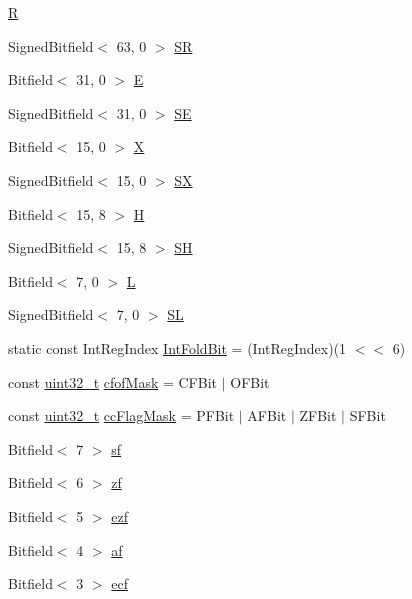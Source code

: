 \begin{DoxyCompactItemize}
\item 
\hyperlink{namespaceX86ISA_acb95449a94688af33f6e9bb090cf2936}{R}
\item 
SignedBitfield$<$ 63, 0 $>$ \hyperlink{namespaceX86ISA_a62886be1bcbf64566d5d2f90a0d27ffe}{SR}
\item 
Bitfield$<$ 31, 0 $>$ \hyperlink{namespaceX86ISA_a71b154dead8fe7930c20fe9b4ce8ae3b}{E}
\item 
SignedBitfield$<$ 31, 0 $>$ \hyperlink{namespaceX86ISA_abbbf2eaf763539e94e31a3f4a250c99a}{SE}
\item 
Bitfield$<$ 15, 0 $>$ \hyperlink{namespaceX86ISA_a8c8da34a185dfa074d1b9976b7ce7a93}{X}
\item 
SignedBitfield$<$ 15, 0 $>$ \hyperlink{namespaceX86ISA_a4e9bd10f5da85e48ae4377e8962cf60a}{SX}
\item 
Bitfield$<$ 15, 8 $>$ \hyperlink{namespaceX86ISA_a1cad4492b2894c49eeb063c9a9569580}{H}
\item 
SignedBitfield$<$ 15, 8 $>$ \hyperlink{namespaceX86ISA_a8f9656f93dee1143c4946caffa827444}{SH}
\item 
Bitfield$<$ 7, 0 $>$ \hyperlink{namespaceX86ISA_a0485da3ef528ce3058f6f335248c0764}{L}
\item 
SignedBitfield$<$ 7, 0 $>$ \hyperlink{namespaceX86ISA_aa51df4793b85b67a85272738df83bcfa}{SL}
\item 
static const IntRegIndex \hyperlink{namespaceX86ISA_a839d36f6b65e52c16579f4cdb5165f15}{IntFoldBit} = (IntRegIndex)(1 $<$$<$ 6)
\item 
const \hyperlink{Type_8hh_a435d1572bf3f880d55459d9805097f62}{uint32\_\-t} \hyperlink{namespaceX86ISA_a15a21dfb18ead541de5ffe79c5d26e2d}{cfofMask} = CFBit $|$ OFBit
\item 
const \hyperlink{Type_8hh_a435d1572bf3f880d55459d9805097f62}{uint32\_\-t} \hyperlink{namespaceX86ISA_ace12242afd3bc8679daac79ae1338404}{ccFlagMask} = PFBit $|$ AFBit $|$ ZFBit $|$ SFBit
\item 
Bitfield$<$ 7 $>$ \hyperlink{namespaceX86ISA_ae933b798c367bf6712555df2997ffdb6}{sf}
\item 
Bitfield$<$ 6 $>$ \hyperlink{namespaceX86ISA_a4e065baa40115a9e97f678b00ab6e331}{zf}
\item 
Bitfield$<$ 5 $>$ \hyperlink{namespaceX86ISA_af1d947c6379024c0d66832c2e1e9fd84}{ezf}
\item 
Bitfield$<$ 4 $>$ \hyperlink{namespaceX86ISA_ac1c96b02ad0857356150dc13fbcec627}{af}
\item 
Bitfield$<$ 3 $>$ \hyperlink{namespaceX86ISA_ac8f3e63e6342b7d480634837764fa194}{ecf}
$$
\end{DoxyCompactItemize}
